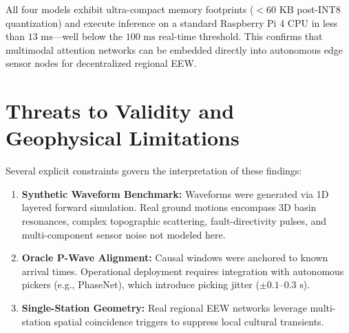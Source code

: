 \documentclass[journal]{IEEEtran}
\begin{document}
\begin{table}[t]
\caption{Edge Hardware Complexity, Memory Footprint, and Inference Latency Profiling}
\label{tab:edge_latency}
\centering
{}
\end{table}

All four models exhibit ultra-compact memory footprints ($< 60\text{ KB}$ post-INT8 quantization) and execute inference on a standard Raspberry Pi 4 CPU in less than $13\text{ ms}$---well below the $100\text{ ms}$ real-time threshold. This confirms that multimodal attention networks can be embedded directly into autonomous edge sensor nodes for decentralized regional EEW.

\section{Threats to Validity and Geophysical Limitations}
Several explicit constraints govern the interpretation of these findings:
\begin{enumerate}
    \item \textbf{Synthetic Waveform Benchmark:} Waveforms were generated via 1D layered forward simulation. Real ground motions encompass 3D basin resonances, complex topographic scattering, fault-directivity pulses, and multi-component sensor noise not modeled here.
    \item \textbf{Oracle P-Wave Alignment:} Causal windows were anchored to known arrival times. Operational deployment requires integration with autonomous pickers (e.g., PhaseNet), which introduce picking jitter ($\pm 0.1\text{--}0.3\text{ s}$).
    \item \textbf{Single-Station Geometry:} Real regional EEW networks leverage multi-station spatial coincidence triggers to suppress local cultural transients.
\end{enumerate}
\end{document}
